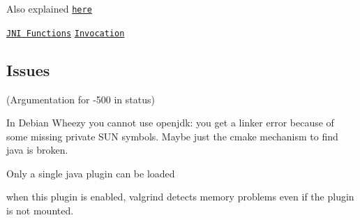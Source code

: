 Also explained \href{https://docs.oracle.com/javase/7/docs/technotes/guides/jni/spec/types.html#wp15773}{\tt here}

\href{https://docs.oracle.com/javase/7/docs/technotes/guides/jni/spec/functions.html}{\tt J\+N\+I Functions} \href{https://docs.oracle.com/javase/7/docs/technotes/guides/jni/spec/invocation.html}{\tt Invocation}

\subsection*{Issues}

(Argumentation for -\/500 in status)


\begin{DoxyItemize}
\item In Debian Wheezy you cannot use openjdk\+: you get a linker error because of some missing private S\+U\+N symbols. Maybe just the cmake mechanism to find java is broken.
\item Only a single java plugin can be loaded
\item when this plugin is enabled, valgrind detects memory problems even if the plugin is not mounted. 
\end{DoxyItemize}